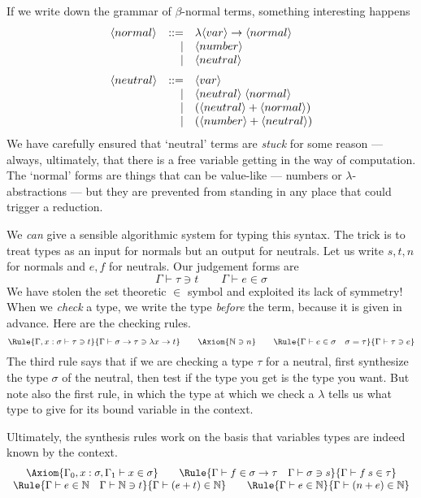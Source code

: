 \documentclass{article}
\begin{document}
If we write down the grammar of $\beta$-normal terms, something
interesting happens
\[\begin{array}{lrl}
    \NT{normal} & ::= & \lambda \NT{var} \to \NT{normal} \\
    & | & \NT{number} \\
    & | & \NT{neutral} \medskip \\
    \NT{neutral} & ::= & \NT{var} \\
   & | &  \NT{neutral} \;  \NT{normal} \\
   & | &  (\NT{neutral} +  \NT{normal}) \\
   & | &  (\NT{number} +  \NT{neutral}) \\
\end{array}  \]
We have carefully ensured that `neutral' terms are \emph{stuck}
for some reason --- always, ultimately, that there is a free
variable getting in the way of computation. The `normal' forms
are things that can be value-like --- numbers or $\lambda$-abstractions ---
but they are prevented from standing in any place that could trigger
a reduction.

We \emph{can} give a sensible algorithmic system for typing this syntax.
The trick is to treat types as an input for normals but an output for neutrals.
Let us write $s,t,n$ for normals and $e,f$ for neutrals. Our judgement forms are
\[
  \Gamma \vdash \tau \ni t \qquad \Gamma \vdash e\in\sigma
\]
We have stolen the set theoretic $\in$ symbol and exploited its lack of
symmetry! When we \emph{check} a type, we write the type \emph{before} the
term, because it is given in advance. Here are the checking rules.
\[
  \Rule{\Gamma,x:\sigma \vdash \tau \ni t}
  {\Gamma\vdash \sigma\to\tau \ni \lambda x\to t}
  \qquad
  \Axiom{\Nat\ni n}
  \qquad
  \Rule{\Gamma\vdash e\in\sigma\quad \sigma = \tau}
       {\Gamma\vdash \tau \ni e}
  \]
The third rule says that if we are checking a type $\tau$ for a neutral,
first synthesize the type $\sigma$ of the neutral, then test if the type you
get is the type you want. But note also the first rule, in which the type
at which we check a $\lambda$ tells us what type to give for its bound
variable in the context.

Ultimately, the synthesis rules work on the basis that variables types are indeed
known by the context.
\[\begin{array}{c}
  \Axiom{\Gamma_0,x:\sigma,\Gamma_1\vdash x\in\sigma} \qquad
  \Rule{\Gamma\vdash f\in \sigma\to\tau \quad \Gamma\vdash \sigma\ni s}
    {\Gamma\vdash f\:s\in \tau}
    \\
  \Rule{\Gamma\vdash e\in\Nat\quad \Gamma\vdash \Nat\ni t}
  {\Gamma\vdash (e + t) \in \Nat} \qquad
  \Rule{\Gamma\vdash e\in\Nat}
    {\Gamma\vdash (n+e)\in\Nat}
\end{array}  \]
\end{document}

